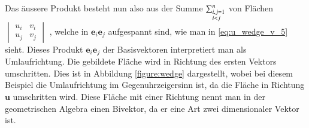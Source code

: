 Das äussere Produkt besteht nun also aus der Summe 
    \(\sum_{\begin{subarray}{l}i,j=1\\i < j\end{subarray}}^n\)
    von Flächen 
    \(\begin{vmatrix} 
    	u_i & v_i \\
    	u_j & v_j
    \end{vmatrix}\)
, welche in $\textbf{e}_i\textbf{e}_j$ aufgespannt sind, wie man in \eqref{eq:u_wedge_v_5} sieht. 
Dieses Produkt $\textbf{e}_i\textbf{e}_j$ der Basisvektoren interpretiert man als Umlaufrichtung.
Die gebildete Fläche wird in Richtung des ersten Vektors umschritten. 
Dies ist in Abbildung \ref{figure:wedge} dargestellt, wobei bei diesem Beispiel die Umlaufrichtung im Gegenuhrzeigersinn ist, da die Fläche in Richtung $\textbf{u}$ umschritten wird. 
Diese Fläche mit einer Richtung nennt man in der geometrischen Algebra einen Bivektor, da er eine Art zwei dimensionaler Vektor ist. 
